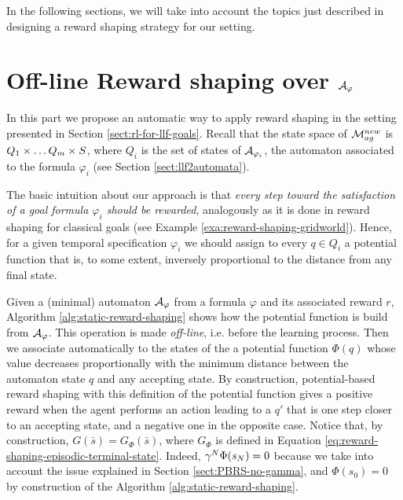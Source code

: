 \medskip
In the following sections, we will take into account the topics just described in designing a reward shaping strategy for our setting.

\section{Off-line Reward shaping over $\mathcal{A}_\varphi$}\label{sect:off-line-reward-shaping}
In this part we propose an automatic way to apply reward shaping in the setting presented in Section \ref{sect:rl-for-llf-goals}.
Recall that the state space of $\mathcal{M}_{ag}^{new}$ is $Q_1\times \dots Q_m \times S$, where $Q_i$ is the set of states of $\mathcal{A}_{\varphi_i}$, the automaton associated to the \LLf formula $\varphi_i$ (see Section \ref{sect:llf2automata}).

The basic intuition about our approach is that \emph{every step toward the satisfaction of a goal formula $\varphi_i$ should be rewarded}, analogously as it is done in reward shaping for classical goals (see Example \ref{exa:reward-shaping-gridworld}). Hence, for a given temporal specification $\varphi_i$ we should assign to every $q\in Q_i$ a potential function that is, to some extent, inversely proportional to the distance from any final state.

Given a (minimal) automaton $\mathcal{A}_{\varphi}$ from a \LLf formula $\varphi$ and its associated reward $r$, Algorithm \ref{alg:static-reward-shaping} shows how the potential function is build from $\mathcal{A}_{\varphi}$. This operation is made \emph{off-line}, i.e. before the learning process. Then we associate automatically to the states of the \DFA a potential function $\Phi(q)$ whose value decreases proportionally with the minimum distance between the automaton state $q$ and any accepting state. By construction, potential-based reward shaping with this definition of the potential function gives a positive reward when the agent performs an action leading to a $q'$ that is one step closer to an accepting state, and a negative one in the opposite case. Notice that, by construction, $G(\bar{s}) = G_\Phi(\bar{s})$, where $G_\Phi$ is defined in Equation \ref{eq:reward-shaping-episodic-terminal-state}. Indeed, $\gamma^N\Phi(s_N) = 0$ because we take into account the issue explained in Section \ref{sect:PBRS-no-gamma}, and $\Phi(s_0) = 0$ by construction of the Algorithm \ref{alg:static-reward-shaping}.

